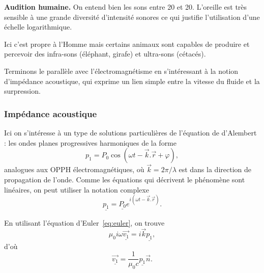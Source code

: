 \begin{slide}
\textbf{Audition humaine.}
On entend bien les sons entre \unit{20}{\hertz} et \unit{20}{\kilo\hertz}.
L'oreille est très sensible à une grande diversité d'intensité sonores ce qui justifie l'utilisation d'une échelle logarithmique.

Ici c'est propre à l'Homme mais certains animaux sont capables de produire et percevoir des infra-sons (éléphant, girafe) et ultra-sons (cétacés).
\end{slide}

\begin{transition}
Terminons le parallèle avec l'électromagnétisme en s'intéressant à la notion d'impédance acoustique, qui exprime un lien simple entre la vitesse du fluide et la surpression.
\end{transition}

\subsubsection{Impédance acoustique}

Ici on s'intéresse à un type de solutions particulières de l'équation de d'Alembert : les ondes planes progressives harmoniques de la forme
\begin{equation*}
p_1 = P_0 \cos \left( \omega t - \overrightarrow{k}.\overrightarrow{r} + \varphi \right),
\end{equation*}
analogues aux OPPH électromagnétiques, où $\overrightarrow{k}=2\pi/\lambda$ est dans la direction de propagation de l'onde.
Comme les équations qui décrivent le phénomène sont linéaires, on peut utiliser la notation complexe
\begin{equation}
\underline{p_1} = \underline{P_0} e^{i\left(\omega t - \overrightarrow{k}.\overrightarrow{r}\right)}.
\end{equation}

En utilisant l'équation d'Euler~\ref{eq:euler}, on trouve
\begin{equation*}
\mu_0 i\omega \underline{\overrightarrow{v_1}} = i\overrightarrow{k}\underline{p_1},
\end{equation*}
d'où
\begin{equation}
\underline{\overrightarrow{v_1}} = \frac{1}{\mu_0 c} \underline{p_1} \overrightarrow{n}.
\end{equation}

